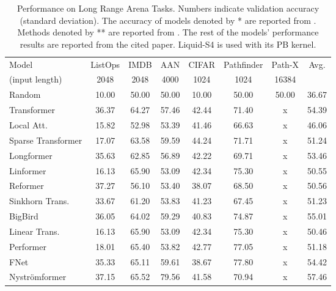 \documentclass{MITcsail}
\begin{document}
\begin{table}[t] 
    \centering
    \caption{Performance on Long Range Arena Tasks. Numbers indicate validation accuracy (standard deviation). The accuracy of models denoted by * are reported from \citep{tay2020long}. Methods denoted by ** are reported from \citep{gu2022efficiently}. The rest of the models' performance results are reported from the cited paper. Liquid-S4 is used with its PB kernel.}
    \begin{adjustbox}{width=1\columnwidth}
    \begin{tabular}{lcccccc|c}
    \toprule
        Model & ListOps & IMDB & AAN	& CIFAR	& Pathfinder & Path-X & Avg. \\
        (input length) & 2048 & 2048 & 4000 & 1024 & 1024 & 16384 & \\
        \midrule
        Random & 10.00 & 50.00 & 50.00 & 10.00 & 50.00 & 50.00 & 36.67 \\
        Transformer \citep{vaswani2017attention} & 36.37 & 64.27 & 57.46 & 42.44 & 71.40 & x & 54.39 \\
        Local Att. \citep{tay2020long} & 15.82 &	52.98 &	53.39 &	41.46 &	66.63 &	x &	46.06 \\
        Sparse Transformer \citep{child2019generating} & 17.07	& 63.58 &	59.59 &	44.24 &	71.71	& x	& 51.24 \\
        Longformer \citep{beltagy2020longformer}  & 35.63	& 62.85	& 56.89	& 42.22	& 69.71	& x & 53.46 \\
        Linformer \citep{wang2020linformer} & 16.13	& 65.90	& 53.09	& 42.34	& 75.30	& x & 	50.55 \\
Reformer \citep{kitaev2019reformer} & 37.27 & 56.10 & 53.40 & 38.07 & 68.50 & x & 50.56 \\
Sinkhorn Trans. \citep{tay2020sparse} & 33.67 & 61.20 & 53.83 & 41.23 & 67.45 & x & 51.23 \\
BigBird \citep{zaheer2020big} & 36.05	& 64.02	& 59.29	& 40.83	& 74.87	& x &	55.01 \\
Linear Trans. \citep{katharopoulos2020transformers}& 16.13 & 65.90 & 53.09 & 42.34 & 75.30 & x & 50.46 \\
Performer  \citep{choromanski2020rethinking} & 18.01 & 65.40 & 53.82 & 42.77 & 77.05 & x & 51.18 \\
\midrule
FNet \citep{lee2021fnet} & 35.33 & 65.11 & 59.61 & 38.67 & 77.80 & x & 54.42 \\
Nyströmformer \citep{xiong2021nystromformer} & 37.15 & 65.52 & 79.56 & 41.58 & 70.94 & x &  57.46 \\

\end{tabular}
\end{adjustbox}
\end{table}
\end{document}
